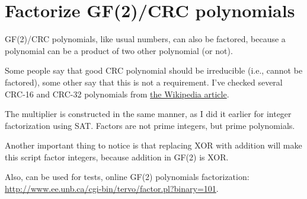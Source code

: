 \section{Factorize GF(2)/CRC polynomials}

GF(2)/CRC polynomials, like usual numbers, can also be factored, because a polynomial can be a product of two other polynomial (or not).

Some people say that good CRC polynomial should be irreducible (i.e., cannot be factored), some other say that this is not a requirement.
I've checked several CRC-16 and CRC-32 polynomials from \href{https://en.wikipedia.org/wiki/Cyclic_redundancy_check}{the Wikipedia article}.

The multiplier is constructed in the same manner, as I did it earlier for integer factorization using SAT.
Factors are not prime integers, but prime polynomials.

Another important thing to notice is that replacing XOR with addition will make this script factor integers, because addition in GF(2) is XOR.

Also, can be used for tests, online GF(2) polynomials factorization: \url{http://www.ee.unb.ca/cgi-bin/tervo/factor.pl?binary=101}.




